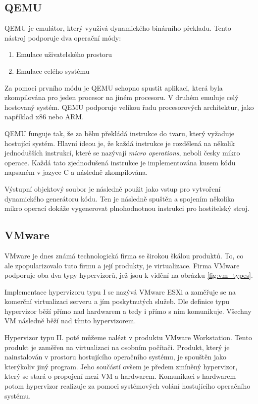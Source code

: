 \subsection{QEMU}
QEMU je emulátor, který využívá dynamického binárního překladu. Tento nástroj podporuje dva operační módy:

\begin{enumerate}
    \item Emulace uživatelského prostoru
    \item Emulace celého systému
\end{enumerate}

Za pomoci prvního módu je QEMU schopno spustit aplikaci, která byla zkompilována pro jeden procesor na jiném procesoru. V druhém emuluje celý hostovaný systém. QEMU podporuje velikou řadu procesorových architektur, jako například x86 nebo ARM. 

QEMU funguje tak, že za běhu překládá instrukce do tvaru, který vyžaduje hostující systém. Hlavní ideou je, že každá instrukce je rozdělená na několik jednodušších instrukcí, které se nazývají \textit{micro operations}, neboli česky mikro operace. Každá tato zjednodušená instrukce je implementována kusem kódu napsaném v jazyce C a následně zkompilována. 

Výstupní objektový soubor je následně použit jako vstup pro vytvoření dynamického generátoru kódu. Ten je následně spuštěn a spojením několika mikro operací dokáže vygenerovat plnohodnotnou instrukci pro hostitelský stroj.\,\cite{chiueh2005survey}\cite{bellard2005qemu}


\subsection{VMware}

VMware je dnes známá technologická firma se širokou škálou produktů. To, co ale zpopularizovalo tuto firmu a její produkty, je virtualizace. Firma VMware podporuje oba dva typy hypervizorů, jež jsou k vidění na obrázku \ref{fig:vm_types}. 

Implementace hypervizoru typu I se nazývá VMware ESXi a zaměřuje se na komerční virtualizaci serveru a jím poskytnutých služeb. Dle definice typu hypervizor běží přímo nad hardwarem a tedy i přímo s ním komunikuje. Všechny VM následně běží nad tímto hypervizorem.\,\cite{gillis_2022}

Hypervizor typu II. poté můžeme nalézt v produktu VMware Workstation. Tento produkt je zaměřen na virtualizaci na osobním počítači. Produkt, který je nainstalován v prostoru hostujícího operačního systému, je spouštěn jako kterýkoliv jiný program. Jeho součástí ovšem je předem zmíněný hypervizor, který se stará o propojení mezi VM a hardwarem. Komunikaci s hardwarem potom hypervizor realizuje za pomoci systémových volání hostujícího operačního systému.\,\cite{9647226}

